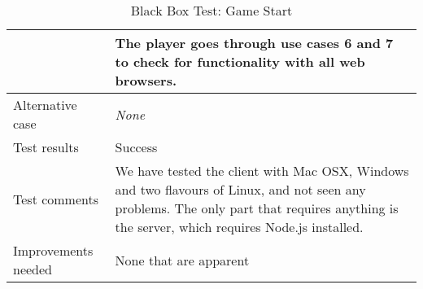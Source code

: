 {\begin{table}[H]
\begin{tabular}{| p{5cm} | p{10cm} |}
		& The player goes through use cases 6 and 7 to check for functionality with all web browsers.\\ \hline
	Alternative case
		& \emph{None}\\ \hline
	Test results 
		& Success \\ \hline
	Test comments
		& We have tested the client with Mac OSX, Windows and two flavours of Linux, and not seen any problems. 
			The only part that requires anything is the server, which requires Node.js installed. \\ \hline
	Improvements needed
		& None that are apparent\\ \hline
\end{tabular}

\caption{Black Box Test: Game Start}
\label{fig:black_box_test_9}
\end{table}}










